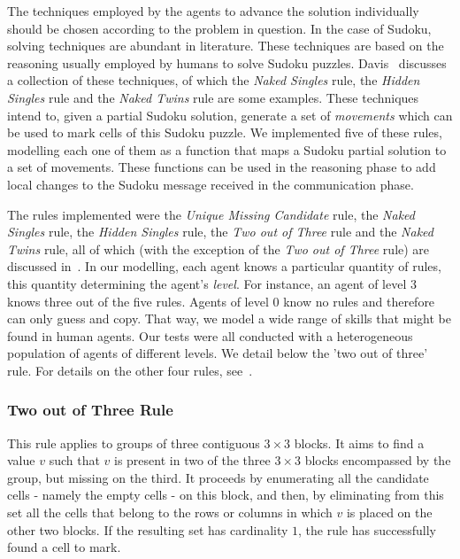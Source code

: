 \documentclass{article}
\begin{document}
The techniques employed by the agents to advance the solution individually should be chosen according to the problem in question. In the case of Sudoku, solving techniques are abundant in literature. %
These techniques are based on the reasoning usually employed by humans to solve Sudoku puzzles. Davis~\cite{davis:mathsudoku} discusses a collection of these techniques, of which the {\em Naked Singles} rule, the {\em Hidden Singles} rule and the {\em Naked Twins} rule are some examples. These techniques intend to, given a partial Sudoku solution, generate a set of {\em movements} which can be used to mark cells of this Sudoku puzzle. We implemented five of these rules, modelling each one of them as a function that maps a Sudoku partial solution to a set of movements. These functions can be used in the reasoning phase to add local changes to the Sudoku message received in the communication phase.

The rules implemented were the {\em Unique Missing Candidate} rule, the {\em Naked Singles} rule, the {\em Hidden Singles} rule, the {\em Two out of Three} rule and the {\em Naked Twins} rule, all of which (with the exception of the {\em Two out of Three} rule) are discussed in~\cite{davis:mathsudoku}. In our modelling, each agent knows a particular quantity of rules, this quantity determining the agent's {\em level}. For instance, an agent of level 3 knows three out of the five rules. Agents of level 0 know no rules and therefore can only guess and copy. That way, we model a wide range of skills that might be found in human agents. Our tests were all conducted with a heterogeneous population of agents of different levels. We detail below the 'two out of three' rule. For details on the other four rules, see~\cite{davis:mathsudoku}.

\subsubsection{Two out of Three Rule}

This rule applies to groups of three contiguous $3 \times 3$ blocks. It aims to find a value $v$ such that $v$ is present in two of the three $3 \times 3$ blocks encompassed by the group, but missing on the third. It proceeds by enumerating all the candidate cells - namely the empty cells - on this block, and then, by eliminating from this set all the cells that belong to the rows or columns in which $v$ is placed on the other two blocks. If the resulting set has cardinality $1$, the rule has successfully found a cell to mark.
\end{document}
